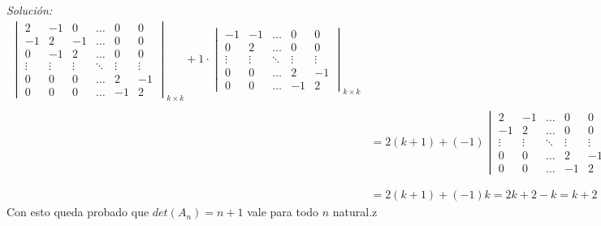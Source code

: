 \documentclass{article}
\newenvironment{solution}
    {\textit{Solución:}}
    {}
\begin{document}
\begin{solution}
\[\begin{aligned}
\begin{vmatrix} 2 & -1 & 0 & \dots & 0 & 0 \\ -1 & 2 & -1 & \dots & 0 & 0 \\ 0 & -1 & 2 & \dots & 0 & 0 \\ \vdots & \vdots & \vdots & \ddots & \vdots & \vdots \\ 0 & 0 & 0 & \dots & 2 & -1 \\ 0 & 0 & 0 & \dots & -1 & 2 \end{vmatrix}_{k\times k} + 1 \cdot 
\begin{vmatrix} -1 & -1 & \dots & 0 & 0 \\ 0 & 2 & \dots & 0 & 0 \\ \vdots  & \vdots & \ddots & \vdots & \vdots \\ 0 & 0 & \dots & 2 & -1 \\ 0 & 0 & \dots & -1 & 2 \end{vmatrix}_{k\times k}  \\ \\
&= 2 (k+1) + (-1) 
\begin{vmatrix} 2 & -1 &  \dots & 0 & 0 \\  -1 & 2 & \dots & 0 & 0 \\ \vdots & \vdots & \ddots & \vdots & \vdots \\ 0 & 0 & \dots & 2 & -1 \\ 0 &0& \dots & -1 & 2 \end{vmatrix}_{(k-1)\times (k-1)}  \\ \\
&= 2 (k+1) + (-1)k = 2k+2-k = k+2
\end{aligned}
\]
Con esto queda probado que $det(A_n)=n+1$ vale para todo $n$ natural.z
\end{solution}
\end{document}
